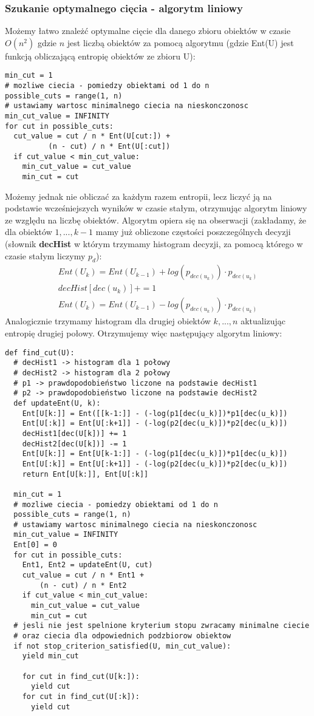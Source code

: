 \documentclass[magisterska]{pracamgr}
\theoremstyle{plain}
\theoremstyle{definition}
\theoremstyle{remark}
\begin{document}
\subsubsection{Szukanie optymalnego cięcia - algorytm liniowy}
Możemy łatwo znależć optymalne cięcie dla danego zbioru obiektów w czasie $O(n^2)$ gdzie $n$ jest
liczbą obiektów za pomocą algorytmu (gdzie Ent(U) jest funkcją obliczającą entropię obiektów ze zbioru U):
\begin{lstlisting}
min_cut = 1
# mozliwe ciecia - pomiedzy obiektami od 1 do n
possible_cuts = range(1, n)
# ustawiamy wartosc minimalnego ciecia na nieskonczonosc
min_cut_value = INFINITY
for cut in possible_cuts:
  cut_value = cut / n * Ent(U[cut:]) + 
	      (n - cut) / n * Ent(U[:cut])
  if cut_value < min_cut_value:
    min_cut_value = cut_value
    min_cut = cut	      
\end{lstlisting}
Możemy jednak nie obliczać za każdym razem entropii, lecz liczyć ją na podstawie 
wcześniejszych wyników w czasie stałym, otrzymując algorytm liniowy ze względu na liczbę 
obiektów. Algorytm opiera się na obserwacji (zakładamy, że dla obiektów $1, ..., k-1$ mamy już obliczone 
częstości poszczególnych decyzji (słownik \textbf{decHist} w którym trzymamy histogram decyzji, za pomocą którego w czasie stałym
liczymy $p_d$):
\begin{align*}
  Ent(U_k) = Ent(U_{k-1}) + log(p_{dec(u_k)}) \cdot p_{dec(u_k)} \\
  decHist[dec(u_k)] += 1 \\
  Ent(U_k) = Ent(U_{k-1}) - log(p_{dec(u_k)}) \cdot p_{dec(u_k)}
\end{align*}
Analogicznie trzymamy histogram dla drugiej obiektów $k, ..., n$ aktualizując entropię drugiej połowy.
Otrzymujemy więc następujący algorytm liniowy:
\begin{lstlisting}
def find_cut(U):
  # decHist1 -> histogram dla 1 połowy
  # decHist2 -> histogram dla 2 połowy
  # p1 -> prawdopodobieństwo liczone na podstawie decHist1
  # p2 -> prawdopodobieństwo liczone na podstawie decHist2
  def updateEnt(U, k):
    Ent[U[k:]] = Ent([[k-1:]] - (-log(p1[dec(u_k)])*p1[dec(u_k)])
    Ent[U[:k]] = Ent[U[:k+1]] - (-log(p2[dec(u_k)])*p2[dec(u_k)])
    decHist1[dec(U[k])] += 1    
    decHist2[dec(U[k])] -= 1
    Ent[U[k:]] = Ent[U[k-1:]] - (-log(p1[dec(u_k)])*p1[dec(u_k)])
    Ent[U[:k]] = Ent[U[:k+1]] - (-log(p2[dec(u_k)])*p2[dec(u_k)])
    return Ent[U[k:]], Ent[U[:k]]
    
  min_cut = 1
  # mozliwe ciecia - pomiedzy obiektami od 1 do n
  possible_cuts = range(1, n)
  # ustawiamy wartosc minimalnego ciecia na nieskonczonosc
  min_cut_value = INFINITY
  Ent[0] = 0
  for cut in possible_cuts:
    Ent1, Ent2 = updateEnt(U, cut)
    cut_value = cut / n * Ent1 + 
		(n - cut) / n * Ent2
    if cut_value < min_cut_value:
      min_cut_value = cut_value
      min_cut = cut	
  # jesli nie jest spelnione kryterium stopu zwracamy minimalne ciecie
  # oraz ciecia dla odpowiednich podzbiorow obiektow
  if not stop_criterion_satisfied(U, min_cut_value):
    yield min_cut
    
    for cut in find_cut(U[k:]):
      yield cut 
    for cut in find_cut(U[:k]):
      yield cut
\end{lstlisting}
\end{document}
